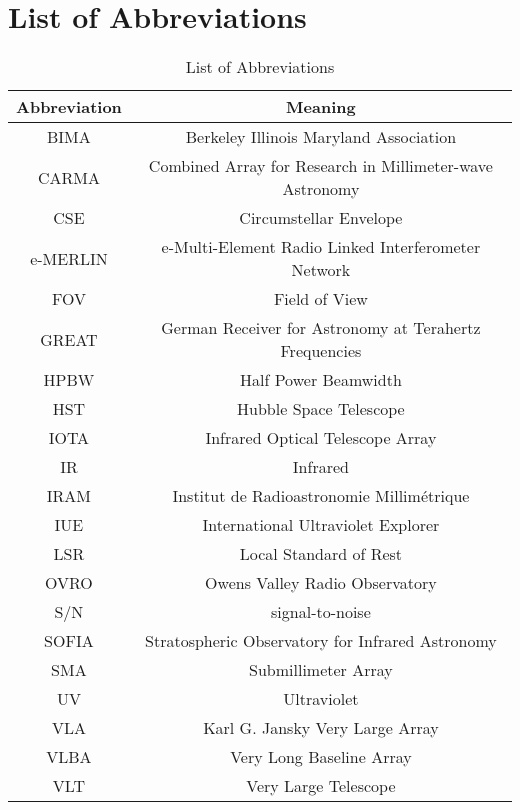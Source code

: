 
\chapter{List of Abbreviations}
\label{app:1}

\begin{table}[!hbt]
\begin{center}
\caption[List of Abbreviations]
{List of Abbreviations}
\begin{tabular}{cc}
\hline
\hline
\rule{0pt}{2.5ex}Abbreviation & Meaning\\
\hline
BIMA & Berkeley Illinois Maryland Association \\
CARMA & Combined Array for Research in Millimeter-wave Astronomy \\
CSE & Circumstellar Envelope \\
e-MERLIN &  e-Multi-Element Radio Linked Interferometer Network \\
FOV & Field of View \\
GREAT & German Receiver for Astronomy at Terahertz Frequencies\\
HPBW & Half Power Beamwidth \\
HST & Hubble Space Telescope \\
IOTA & Infrared Optical Telescope Array\\
IR & Infrared \\
IRAM & Institut de Radioastronomie Millim\'etrique \\
IUE & International Ultraviolet Explorer \\
LSR & Local Standard of Rest \\
OVRO & Owens Valley Radio Observatory \\
S/N & signal-to-noise\\
SOFIA & Stratospheric Observatory for Infrared Astronomy\\
SMA & Submillimeter Array \\
UV & Ultraviolet \\
VLA & Karl G. Jansky Very Large Array \\
VLBA & Very Long Baseline Array \\
VLT & Very Large Telescope \\

\hline
\end{tabular}
\label{tab:6.4.1}
\end{center}
\end{table}



